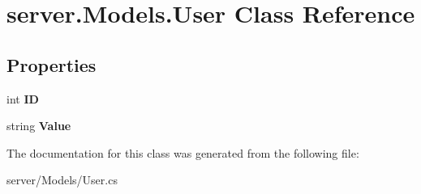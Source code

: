 \hypertarget{classserver_1_1Models_1_1User}{\section{server.\-Models.\-User Class Reference}
\label{classserver_1_1Models_1_1User}
}
\subsection*{Properties}
\begin{DoxyCompactItemize}
\item 
\hypertarget{classserver_1_1Models_1_1User_ae87bfdf668b5aa651fc92c804c505094}{int {\bfseries I\-D}}\label{classserver_1_1Models_1_1User_ae87bfdf668b5aa651fc92c804c505094}

\item 
\hypertarget{classserver_1_1Models_1_1User_a2dd7d7fcbbc12374b248923f13f859a7}{string {\bfseries Value}}\label{classserver_1_1Models_1_1User_a2dd7d7fcbbc12374b248923f13f859a7}

\end{DoxyCompactItemize}


The documentation for this class was generated from the following file\-:\begin{DoxyCompactItemize}
\item 
server/\-Models/User.\-cs\end{DoxyCompactItemize}

